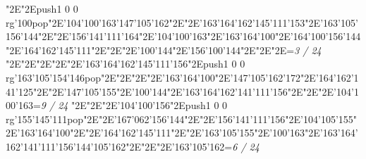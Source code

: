 \null\vfill\enskip\enskip\enskip\ipa\char"2E\enskip\enskip\enskip\ipa\char"2E\pdfcolorstack\match push{1 0 0 rg}\ipa\char'100\pdfcolorstack\match pop{}\ipa\char"2E\ipa\char'104\ipa\char'100\ipa\char'163\bigskip\ipa\char'147\ipa\char'105\ipa\char'162\ipa\char"2E\enskip\enskip\enskip\ipa\char"2E\ipa\char'163\ipa\char'164\ipa\char'162\ipa\char'145\ipa\char'111\ipa\char'153\bigskip\enskip\enskip\ipa\char"2E\ipa\char'163\ipa\char'105\ipa\char'156\ipa\char'144\ipa\char"2E\enskip\ipa\char"2E\ipa\char'156\ipa\char'141\ipa\char'111\ipa\char'164\ipa\char"2E\ipa\char'104\ipa\char'100\ipa\char'163\ipa\char"2E\ipa\char'163\ipa\char'164\ipa\char'100\ipa\char"2E\ipa\char'164\ipa\char'100\ipa\char'156\ipa\char'144\bigskip\enskip\ipa\char"2E\ipa\char'164\ipa\char'162\ipa\char'145\ipa\char'111\ipa\char"2E\enskip\enskip\ipa\char"2E\enskip\enskip\enskip\ipa\char"2E\ipa\char'100\ipa\char'144\ipa\char"2E\enskip\enskip\enskip\enskip\enskip\enskip\bigskip\ipa\char'156\ipa\char'100\ipa\char'144\ipa\char"2E\enskip\enskip\ipa\char"2E\enskip\enskip\enskip\ipa\char"2E\enskip\enskip\enskip\bigskip\vfill\footline={\hfill\tenrm\it 3 / 24}\eject
\null\vfill\enskip\enskip\enskip\ipa\char"2E\enskip\enskip\enskip\ipa\char"2E\enskip\ipa\char"2E\enskip\enskip\enskip\bigskip\enskip\enskip\enskip\ipa\char"2E\enskip\enskip\enskip\ipa\char"2E\ipa\char'163\ipa\char'164\ipa\char'162\ipa\char'145\ipa\char'111\ipa\char'156\bigskip\enskip\enskip\ipa\char"2E\pdfcolorstack\match push{1 0 0 rg}\ipa\char'163\ipa\char'105\ipa\char'154\ipa\char'146\pdfcolorstack\match pop{}\ipa\char"2E\enskip\ipa\char"2E\enskip\enskip\enskip\enskip\ipa\char"2E\enskip\enskip\enskip\ipa\char"2E\ipa\char'163\ipa\char'164\ipa\char'100\ipa\char"2E\ipa\char'147\ipa\char'105\ipa\char'162\ipa\char'172\bigskip\enskip\ipa\char"2E\ipa\char'164\ipa\char'162\ipa\char'141\ipa\char'125\ipa\char"2E\enskip\enskip\ipa\char"2E\ipa\char'147\ipa\char'105\ipa\char'155\ipa\char"2E\ipa\char'100\ipa\char'144\ipa\char"2E\ipa\char'163\ipa\char'164\ipa\char'162\ipa\char'141\ipa\char'111\ipa\char'156\bigskip\enskip\enskip\enskip\ipa\char"2E\enskip\enskip\ipa\char"2E\enskip\enskip\enskip\ipa\char"2E\ipa\char'104\ipa\char'100\ipa\char'163\bigskip\vfill\footline={\hfill\tenrm\it 9 / 24}\eject
\null\vfill\enskip\enskip\enskip\ipa\char"2E\enskip\enskip\enskip\ipa\char"2E\enskip\ipa\char"2E\ipa\char'104\ipa\char'100\ipa\char'156\bigskip\enskip\enskip\enskip\ipa\char"2E\pdfcolorstack\match push{1 0 0 rg}\ipa\char'155\ipa\char'145\ipa\char'111\pdfcolorstack\match pop{}\ipa\char"2E\enskip\enskip\enskip\enskip\enskip\enskip\bigskip\enskip\enskip\ipa\char"2E\ipa\char'167\ipa\char'062\ipa\char'156\ipa\char'144\ipa\char"2E\enskip\ipa\char"2E\ipa\char'156\ipa\char'141\ipa\char'111\ipa\char'156\ipa\char"2E\ipa\char'104\ipa\char'105\ipa\char'155\ipa\char"2E\ipa\char'163\ipa\char'164\ipa\char'100\ipa\char"2E\enskip\enskip\enskip\enskip\bigskip\enskip\ipa\char"2E\ipa\char'164\ipa\char'162\ipa\char'145\ipa\char'111\ipa\char"2E\enskip\enskip\ipa\char"2E\ipa\char'163\ipa\char'105\ipa\char'155\ipa\char"2E\ipa\char'100\ipa\char'163\ipa\char"2E\ipa\char'163\ipa\char'164\ipa\char'162\ipa\char'141\ipa\char'111\ipa\char'156\bigskip\ipa\char'144\ipa\char'105\ipa\char'162\ipa\char"2E\enskip\enskip\ipa\char"2E\enskip\enskip\enskip\ipa\char"2E\ipa\char'163\ipa\char'105\ipa\char'162\bigskip\vfill\footline={\hfill\tenrm\it 6 / 24}\eject
